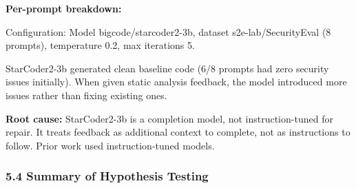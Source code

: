 \textbf{Per-prompt breakdown:}

\begin{table}[htbp]
\centering
{}
\end{table}

Configuration: Model bigcode/starcoder2-3b, dataset s2e-lab/SecurityEval (8 prompts), temperature 0.2, max iterations 5.

StarCoder2-3b generated clean baseline code (6/8 prompts had zero security issues initially). When given static analysis feedback, the model introduced more issues rather than fixing existing ones.

\textbf{Root cause:} StarCoder2-3b is a completion model, not instruction-tuned for repair. It treats feedback as additional context to complete, not as instructions to follow. Prior work \citep{blyth2025static} used instruction-tuned models.

\subsubsection{5.4 Summary of Hypothesis Testing}

\begin{table}[htbp]
\centering
{}
\end{table}
